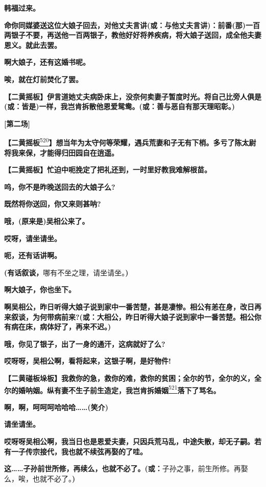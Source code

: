 \textbf{韩福过来。}

\textbf{命你同媒婆送这位大娘子回去，对他丈夫言讲(或：与他丈夫言讲)：前番(那)一百两银子不要，再送他一百两银子，教他好好将养疾病，将大娘子送回，成全他夫妻恩义。就此去罢。}

\textbf{啊大娘子，还有这婚书呢。}

\textbf{唉，就在灯前焚化了罢。}

\textbf{【二黄摇板】伊言道她丈夫病卧床上，没奈何卖妻子暂度时光。将自己比旁人俱是(或：皆是)一样，我岂肯拆散他恩爱鸳鸯。(或：善与恶自有那天理昭彰。)}

\textbf{{[}第二场{]}}

\textbf{【二黄摇板}\protect\hyperlink{fn520}{\textsuperscript{520}}\textbf{】想当年为太守何等荣耀，遇兵荒妻和子无有下梢。多亏了陈太尉将我来保，才能得归田园自在逍遥。}

\textbf{【二黄摇板】忙迫中呃挽定了把礼还到，一时里好教我难解根苗。}

\textbf{呜，你不是昨晚送回去的大娘子么?}

\textbf{既然将你送回，你又来则甚呐?}

\textbf{哦，(原来是)吴相公来了。}

\textbf{哎呀，请坐请坐。}

\textbf{呃，还有话讲啊。}

\textbf{(有话叙谈，}哪有不坐之理，请坐请坐。\textbf{)}

\textbf{啊大娘子，你也坐下。}

\textbf{啊吴相公，昨日听得大娘子说到家中一番苦楚，甚是凄惨。相公有恙在身，改日再来叙谈，为何带病前来?(或：大相公，昨日听得大娘子说到家中一番苦楚。相公你有病在床，病体好了，再来不迟。)}

\textbf{哦，你见了银子，出了一身的通汗，这病就好了么?}

\textbf{哎呀呀，吴相公啊，看将起来，这银子啊，是好物件!}

\textbf{【二黄碰板垛板】我救你的急，救你的难，救你的贫困；全尔的节，全尔的义，全尔的婚呐姻。纵有妻不生子前生造定，我岂肯拆婚姻}\protect\hyperlink{fn521}{\textsuperscript{521}}\textbf{落下了骂名。}

\textbf{啊，啊，呵呵呵哈哈哈\ldots{}\ldots{}(笑介)}

\textbf{请坐请坐。}

\textbf{哎呀呀吴相公啊，我当日也是恩爱夫妻，只因兵荒马乱，中途失散，却无子嗣。若有一子传宗接代，我也就不续弦再娶的了哇。}

\textbf{这\ldots{}\ldots{}子孙前世所修，再续么，也就不必了。(或：}子孙之事，前生所修。再娶么，唉，也就不必了。\textbf{)}

